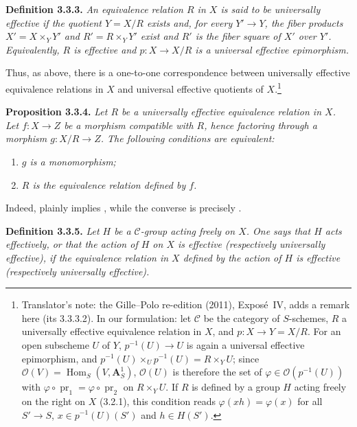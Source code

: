 \medskip
\noindent{}\textbf{Definition 3.3.3.}
\textit{An equivalence relation \(R\) in \(X\) is said to be
\emph{universally effective} if the quotient \(Y=X/R\) exists and, for
every \(Y'\to Y\), the fiber products \(X'=X\times_Y Y'\) and
\(R'=R\times_Y Y'\) exist and \(R'\) is the fiber square of \(X'\) over
\(Y'\). Equivalently, \(R\) is effective and \(p:X\to X/R\) is a universal
effective epimorphism.}

Thus, as above, there is a one-to-one correspondence between universally
effective equivalence relations in \(X\) and universal effective quotients
of \(X\).\footnote{Translator's note: the Gille--Polo re-edition (2011), Expos\'e~IV, adds a
remark here (its 3.3.3.2). In our formulation: let \(\mathscr C\) be the
category of \(S\)-schemes, \(R\) a universally effective equivalence relation
in \(X\), and \(p\colon X\to Y=X/R\). For an open subscheme \(U\) of \(Y\),
\(p^{-1}(U)\to U\) is again a universal effective epimorphism, and
\(p^{-1}(U)\times_Up^{-1}(U)=R\times_YU\); since
\(\mathcal O(V)=\operatorname{Hom}_S(V,\mathbf A^1_S)\), \(\mathcal O(U)\) is
therefore the set of \(\varphi\in\mathcal O(p^{-1}(U))\) with
\(\varphi\circ\operatorname{pr}_1=\varphi\circ\operatorname{pr}_2\) on
\(R\times_YU\). If \(R\) is defined by a group \(H\) acting freely on the right
on \(X\) (3.2.1), this condition reads \(\varphi(xh)=\varphi(x)\) for all
\(S'\to S\), \(x\in p^{-1}(U)(S')\) and \(h\in H(S')\).}

\medskip
\noindent{}\textbf{Proposition 3.3.4.}
\textit{Let \(R\) be a universally effective equivalence relation in
\(X\). Let \(f:X\to Z\) be a morphism compatible with \(R\), hence
factoring through a morphism \(g:X/R\to Z\). The following conditions are
equivalent:}
\begin{enumerate}
  \item[(i)] \textit{\(g\) is a monomorphism;}
  \item[(ii)] \textit{\(R\) is the equivalence relation defined by \(f\).}
\end{enumerate}

Indeed,  plainly implies , while the converse is precisely .

\medskip
\noindent{}\textbf{Definition 3.3.5.}
\textit{Let \(H\) be a \(\mathscr C\)-group acting freely on \(X\). One
says that \(H\) acts \emph{effectively}, or that the action of \(H\) on
\(X\) is \emph{effective} (respectively \emph{universally effective}), if
the equivalence relation in \(X\) defined by the action of \(H\) is
effective (respectively universally effective).}

